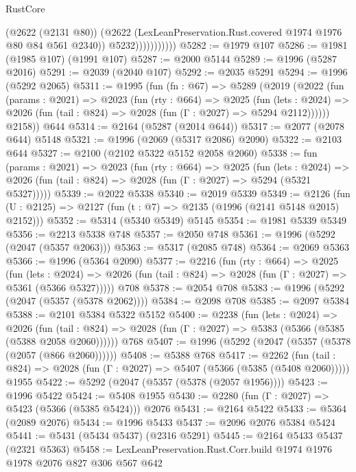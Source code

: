 \begin{lexlean}{RustCore}
\begin{coremodule}
                          (@2622 (@2131 @80))
                          (@2622 (LexLeanPreservation.Rust.covered @1974 @1976 @80 @84 @561 @2340))
                          @5232)))))))))))
@5282 := @1979 @107
@5286 := @1981 (@1985 @107) (@1991 @107)
@5287 := @2000 @5144
@5289 := @1996 (@5287 @2016)
@5291 := @2039 (@2040 @107)
@5292 := @2035 @5291
@5294 := @1996 (@5292 @2065)
@5311 := @1995
    (fun (fn : @67) =>
    @5289
      (@2019
        (@2022
          (fun (params : @2021) =>
          @2023
            (fun (rty : @664) =>
            @2025
              (fun (lets : @2024) =>
              @2026 (fun (tail : @824) => @2028 (fun (Γ : @2027) => @5294 @2112))))))
        @2158))
    @644
@5314 := @2164 (@5287 (@2014 @644))
@5317 := @2077 (@2078 @644) @5148
@5321 := @1996 (@2069 (@5317 @2086) @2090)
@5322 := @2103 @644
@5327 := @2100 (@2102 @5322 @5152 @2058 @2060)
@5338 := fun (params : @2021) =>
  @2023
    (fun (rty : @664) =>
    @2025
      (fun (lets : @2024) =>
      @2026 (fun (tail : @824) => @2028 (fun (Γ : @2027) => @5294 (@5321 @5327)))))
@5339 := @2022 @5338
@5340 := @2019 @5339
@5349 := @2126 (fun (U : @2125) => @2127 (fun (t : @7) => @2135 (@1996 (@2141 @5148 @2015) @2152)))
@5352 := @5314 (@5340 @5349) @5145
@5354 := @1981 @5339 @5349
@5356 := @2213 @5338 @748
@5357 := @2050 @748
@5361 := @1996 (@5292 (@2047 (@5357 @2063)))
@5363 := @5317 (@2085 @748)
@5364 := @2069 @5363
@5366 := @1996 (@5364 @2090)
@5377 := @2216
    (fun (rty : @664) =>
    @2025
      (fun (lets : @2024) =>
      @2026 (fun (tail : @824) => @2028 (fun (Γ : @2027) => @5361 (@5366 @5327)))))
    @708
@5378 := @2054 @708
@5383 := @1996 (@5292 (@2047 (@5357 (@5378 @2062))))
@5384 := @2098 @708
@5385 := @2097 @5384
@5388 := @2101 @5384 @5322 @5152
@5400 := @2238
    (fun (lets : @2024) =>
    @2026
      (fun (tail : @824) => @2028 (fun (Γ : @2027) => @5383 (@5366 (@5385 (@5388 @2058 @2060))))))
    @768
@5407 := @1996 (@5292 (@2047 (@5357 (@5378 (@2057 (@866 @2060))))))
@5408 := @5388 @768
@5417 := @2262
    (fun (tail : @824) => @2028 (fun (Γ : @2027) => @5407 (@5366 (@5385 (@5408 @2060)))))
    @1955
@5422 := @5292 (@2047 (@5357 (@5378 (@2057 @1956))))
@5423 := @1996 @5422
@5424 := @5408 @1955
@5430 := @2280 (fun (Γ : @2027) => @5423 (@5366 (@5385 @5424))) @2076
@5431 := @2164 @5422
@5433 := @5364 (@2089 @2076)
@5434 := @1996 @5433
@5437 := @2096 @2076 @5384 @5424
@5441 := @5431 (@5434 @5437) (@2316 @5291)
@5445 := @2164 @5433 @5437 (@2321 @5363)
@5458 := LexLeanPreservation.Rust.Corr.build
    @1974
    @1976
    @1978
    @2076
    @827
    @306
    @567
    @642

\end{coremodule}
\end{lexlean}
